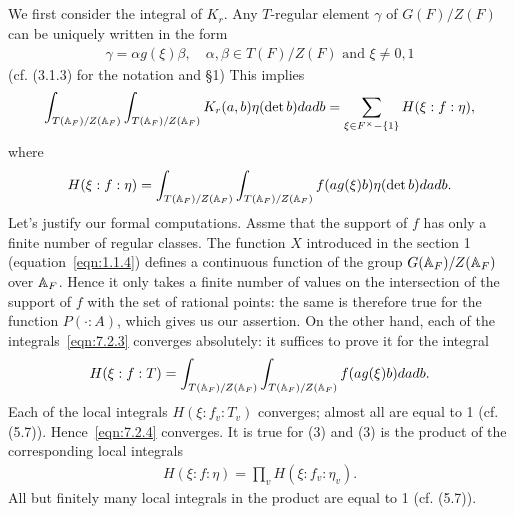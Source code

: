 \subsection{}
We first consider the integral of $K_r$.
Any $T$-regular element $\gamma$ of $G(F) /Z(F)$ can be uniquely written in the form
\begin{align}
    \gamma = \alpha g(\xi) \beta, \quad \alpha, \beta \in T(F) /Z(F)\text{ and } \xi \neq 0, 1
\end{align}
(cf. (3.1.3) for the notation and \S 1)
This implies
\begin{align}
    \int_{T(\mathbb{A}_F) / Z(\mathbb{A}_F)} \int_{T(\mathbb{A}_F) / Z(\mathbb{A}_F)} K_r(a, b) \eta(\det b) da db = \sum_{\xi \in F^\times - \{1\}} H(\xi: f: \eta),
\end{align}
where
\begin{align}
\label{eqn:7.2.3}
    H(\xi: f: \eta) = \int_{T(\mathbb{A}_F) / Z(\mathbb{A}_F)}\int_{T(\mathbb{A}_F)/Z(\mathbb{A}_F)} f(ag(\xi)b) \eta(\det b) da db.
\end{align}
Let's justify our formal computations.
Assme that the support of $f$ has only a finite number of regular classes.
The function $X$ introduced in the section 1 (equation~\eqref{eqn:1.1.4}) defines a continuous function of the group $G(\mathbb{A}_F)/Z(\mathbb{A}_F)$ over $\mathbb{A}_F$.
Hence it only takes a finite number of values on the intersection of the support of $f$ with the set of rational points:
the same is therefore true for the function $P(\cdot:A)$, which gives us our assertion.
On the other hand, each of the integrals~\eqref{eqn:7.2.3} converges absolutely: it suffices to prove it for the integral
\begin{align}
    \label{eqn:7.2.4}
    H(\xi:f:T) = \int_{T(\mathbb{A}_F) / Z(\mathbb{A}_F)} \int_{T(\mathbb{A}_F) / Z(\mathbb{A}_F)} f(ag(\xi)b) dadb.
\end{align}
Each of the local integrals $H(\xi: f_v: T_v)$ converges; almost all are equal to 1 (cf. (5.7)).
Hence~\eqref{eqn:7.2.4} converges.
It is true for (3) and (3) is the product of the corresponding local integrals
\begin{align}
    H(\xi:f:\eta) = \prod_v H(\xi: f_v: \eta_v).
\end{align}
All but finitely many local integrals in the product are equal to 1 (cf. (5.7)).

